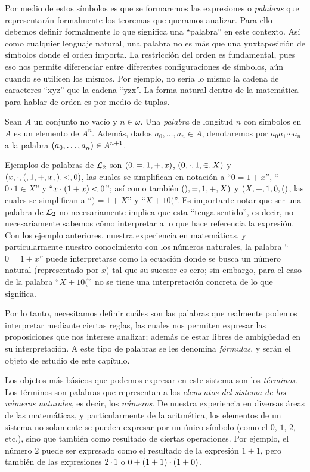 Por medio de estos símbolos es que se formaremos las expresiones o \emph{palabras} que representarán formalmente los teoremas que queramos analizar. Para ello debemos definir formalmente lo que significa una ``palabra'' en este contexto. Así como cualquier lenguaje natural, una palabra no es más que una yuxtaposición de símbolos donde el orden importa. La restricción del orden es fundamental, pues eso nos permite diferenciar entre diferentes configuraciones de símbolos, aún cuando se utilicen los mismos. Por ejemplo, no sería lo mismo la cadena de caracteres ``xyz'' que la cadena ``yzx''. La forma natural dentro de la matemática para hablar de orden es por medio de tuplas.

\begin{definition}[Palabras]
	Sean $A$ un conjunto no vacío y $n\in\omega$. Una \emph{palabra} de longitud $n$ con símbolos en $A$ es un elemento de $A^{n}$. Además, dados $a_{0},\dotsc, a_{n}\in A$, denotaremos por $a_{0}a_{1}\cdots a_{n}$ a la palabra $\pa*{a_{0},\dotsc, a_{n}}\in A^{n + 1}$.
\end{definition}

Ejemplos de palabras de $\ARITMETICA$ son $\pa*{0, =, 1, +, x}$, $\pa*{0, \cdot, 1,\in, X}$ y $\pa*{x,\cdot, (, 1, +, x, ), <, 0}$, las cuales se simplifican en notación a ``$0 = 1 + x$'', ``$0\cdot 1\in X$'' y ``$x\cdot\pa*{1 + x} < 0$''; así como también $\pa*{), =, 1, +, X}$ y $\pa*{X, +, 1, 0, (}$, las cuales se simplifican a ``$) = 1 + X$'' y ``$X + 10($''. Es importante notar que ser una palabra de $\ARITMETICA$ no necesariamente implica que esta ``tenga sentido'', es decir, no necesariamente sabemos cómo interpretar a lo que hace referencia la expresión. Con los ejemplo anteriores, nuestra experiencia en matemáticas, y particularmente nuestro conocimiento con los números naturales, la palabra ``$0 = 1 + x$'' puede interpretarse como la ecuación donde se busca un número natural (representado por $x$) tal que su sucesor es cero; sin embargo, para el caso de la palabra ``$X + 10($'' no se tiene una interpretación concreta de lo que significa. 

Por lo tanto, necesitamos definir cuáles son las palabras que realmente podemos interpretar mediante ciertas reglas, las cuales nos permiten expresar las proposiciones que nos interese analizar; además de estar libres de ambigüedad en su interpretación. A este tipo de palabras se les denomina \emph{fórmulas}, y serán el objeto de estudio de este capítulo.

Los objetos más básicos que podemos expresar en este sistema son los \emph{términos}. Los términos son palabras que representan a los \emph{elementos del sistema de los números naturales}, es decir, los \emph{números}. De nuestra experiencia en diversas áreas de las matemáticas, y particularmente de la aritmética, los elementos de un sistema no solamente se pueden expresar por un único símbolo (como el $0$, $1$, $2$, etc.), sino que también como resultado de ciertas operaciones. Por ejemplo, el número $2$ puede ser expresado como el resultado de la expresión $1 + 1$, pero también de las expresiones $2\cdot 1$ o $0 +\pa*{1 + 1}\cdot\pa*{1 + 0}$. 


